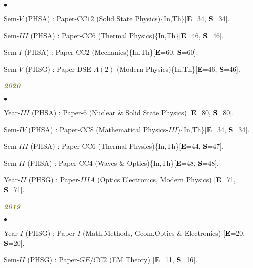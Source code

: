 \documentclass[margin,line]{res}
\newenvironment{list1}{
  \begin{list}{\ding{113}}{%
      \setlength{\itemsep}{0in}
      \setlength{\parsep}{0in} \setlength{\parskip}{0in}
      \setlength{\topsep}{0in} \setlength{\partopsep}{0in} 
      \setlength{\leftmargin}{0.17in}}}{\end{list}}
\newenvironment{list2}{
  \begin{list}{$\bullet$}{%
      \setlength{\itemsep}{0in}
      \setlength{\parsep}{0in} \setlength{\parskip}{0in}
      \setlength{\topsep}{0in} \setlength{\partopsep}{0in} 
      \setlength{\leftmargin}{0.2in}}}{\end{list}}
\begin{document}
\begin{resume}
\begin{list2}
\item Sem-$V$ (PHSA) : Paper-CC$12$ (Solid State Physics)\textcolor{alizarin}{\{In,Th\}}[\textcolor{black}{\bf E}=34, \textcolor{black}{\bf S}=34]. 
\item Sem-$III$ (PHSA) : Paper-CC6 (Thermal Physics)\textcolor{alizarin}{\{In,Th\}}[\textcolor{black}{\bf E}=46, \textcolor{black}{\bf S}=46]. 
\item Sem-$I$ (PHSA) : Paper-CC$2$ (Mechanics)\textcolor{alizarin}{\{In,Th\}}[\textcolor{black}{\bf E}=60, \textcolor{black}{\bf S}=60]. 
\item Sem-$V$ (PHSG) : Paper-DSE $A(2)$ (Modern Physics)\textcolor{alizarin}{\{In,Th\}}[\textcolor{black}{\bf E}=46, \textcolor{black}{\bf S}=46]. 
\end{list2}
\begin{list1}
\item[] \textcolor{olive}{\underline{\textbf{\textit{2020}}}}
\vspace{1mm}
\end{list1}
\begin{list2}
\item Year-$III$ (PHSA) : Paper-6 (Nuclear \& Solid State Physics) [\textcolor{black}{\bf E}=80, \textcolor{black}{\bf S}=80]. 
\item Sem-$IV$ (PHSA) : Paper-CC8 (Mathematical Physics-$III$)\textcolor{alizarin}{\{In,Th\}}[\textcolor{black}{\bf E}=34, \textcolor{black}{\bf S}=34]. 
\item Sem-$III$ (PHSA) : Paper-CC6 (Thermal Physics)\textcolor{alizarin}{\{In,Th\}}[\textcolor{black}{\bf E}=44, \textcolor{black}{\bf S}=47]. 
\item Sem-$II$ (PHSA) : Paper-CC4 (Waves \& Optics)\textcolor{alizarin}{\{In,Th\}}[\textcolor{black}{\bf E}=48, \textcolor{black}{\bf S}=48]. 
\item Year-$II$ (PHSG) : Paper-$IIIA$ (Optics Electronics, Modern Physics) [\textcolor{black}{\bf E}=71, \textcolor{black}{\bf S}=71]. 
\end{list2}
\begin{list1}
\item[] \textcolor{olive}{\underline{\textbf{\textit{2019}}}}
\vspace{1mm}
\end{list1}
\begin{list2}
\item Year-$I$ (PHSG) : Paper-$I$ (Math.Methods, Geom.Optics \& Electronics) [\textcolor{black}{\bf E}=20, \textcolor{black}{\bf S}=20]. 
\item Sem-$II$ (PHSG) : Paper-$GE/CC2$ (EM Theory) [\textcolor{black}{\bf E}=11, \textcolor{black}{\bf S}=16]. 

\end{list2}
\end{resume}
\end{document}
